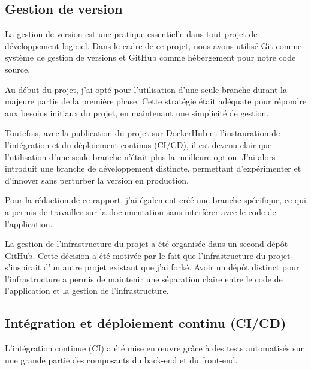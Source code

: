 \subsection{Gestion de version}\label{subsec:gestion-de-version}

La gestion de version est une pratique essentielle dans tout projet de développement logiciel.
Dans le cadre de ce projet, nous avons utilisé Git comme système de gestion de versions et GitHub comme hébergement pour notre code source.

Au début du projet, j'ai opté pour l'utilisation d'une seule branche durant la majeure partie de la première phase.
Cette stratégie était adéquate pour répondre aux besoins initiaux du projet, en maintenant une simplicité de gestion.

Toutefois, avec la publication du projet sur DockerHub et l'instauration de l'intégration et du déploiement continus (CI/CD), il est devenu clair que l'utilisation d'une seule branche n'était plus la meilleure option.
J'ai alors introduit une branche de développement distincte, permettant d'expérimenter et d'innover sans perturber la version en production.

Pour la rédaction de ce rapport, j'ai également créé une branche spécifique, ce qui a permis de travailler sur la documentation sans interférer avec le code de l'application.

La gestion de l'infrastructure du projet a été organisée dans un second dépôt GitHub.
Cette décision a été motivée par le fait que l'infrastructure du projet s'inspirait d'un autre projet existant que j'ai forké.
Avoir un dépôt distinct pour l'infrastructure a permis de maintenir une séparation claire entre le code de l'application et la gestion de l'infrastructure.

\subsection{Intégration et déploiement continu (CI/CD)}\label{subsec:integration-et-deploiement-continu-(ci/cd)}

L'intégration continue (CI) a été mise en œuvre grâce à des tests automatisés sur une grande partie des composants du back-end et du front-end.

